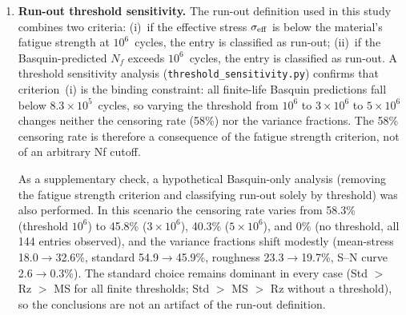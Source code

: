 \documentclass[twocolumn,12pt,a4paper]{article}
\begin{document}
\begin{enumerate}
        \textbf{Statistical validation of the censoring assumption.}
        The non-informative-censoring assumption underlying the
        benchmark AFT was tested two ways
        (\texttt{pattern\_mixture\_aft.py}).
        (i)~\emph{Censoring-rate sweep}: Monte Carlo recovery of known
        variance shares at 30\%, 45\%, 58\% and 75\% censoring (300
        simulations per level) gives a dominant-factor bias of
        $+1.6$, $+2.2$, $+2.7$ and $+2.9$~pp respectively, with
        RMSE growing from 2.2 to 3.5~pp---the decomposition remains
        identifiable up to the paper's 58\% operating point and
        degrades only gracefully at 75\%.
        (ii)~\emph{Pattern-mixture AFT}: censoring probability was
        made weakly dependent on the latent life (the mechanism by
        which the assumption can fail here, since run-out is driven by
        the same stress model that predicts life). At a fixed 58\%
        censoring, the recovered standard share shifts by at most
        $+4.5$~pp relative to the non-informative case---a modest
        perturbation that does not change the ranking. The benchmark
        AFT therefore carries a small, quantifiable potential bias
        (a few pp on the dominant share) if the censoring is mildly
        informative; this is stated as a residual limitation rather
        than claimed to be zero.
  \item \textbf{Run-out threshold sensitivity.} The run-out definition
        used in this study combines two criteria: (i)~if the effective
        stress $\sigma_{\rm eff}$ is below the material's fatigue
        strength at $10^6$~cycles, the entry is classified as run-out;
        (ii)~if the Basquin-predicted $N_f$ exceeds $10^6$~cycles, the
        entry is classified as run-out. A threshold sensitivity analysis
        (\texttt{threshold\_sensitivity.py}) confirms that
        criterion~(i) is the binding constraint: all finite-life
        Basquin predictions fall below $8.3\times10^5$~cycles, so
        varying the threshold from $10^6$ to $3\times10^6$ to
        $5\times10^6$ changes neither the censoring rate (58\%) nor the
        variance fractions. The 58\% censoring rate is therefore a
        consequence of the fatigue strength criterion, not of an
        arbitrary Nf cutoff.

        As a supplementary check, a hypothetical Basquin-only analysis
        (removing the fatigue strength criterion and classifying run-out
        solely by threshold) was also performed. In this scenario the
        censoring rate varies from 58.3\% (threshold $10^6$) to 45.8\%
        ($3\times10^6$), 40.3\% ($5\times10^6$), and 0\% (no threshold,
        all 144 entries observed), and the variance fractions shift
        modestly (mean-stress 18.0$\rightarrow$32.6\%, standard
        54.9$\rightarrow$45.9\%, roughness 23.3$\rightarrow$19.7\%,
        S--N curve 2.6$\rightarrow$0.3\%). The standard choice remains
        dominant in every case (Std $>$ Rz $>$ MS for all finite
        thresholds; Std $>$ MS $>$ Rz without a threshold), so the
        conclusions are not an artifact of the run-out definition.


\end{enumerate}
\end{document}
